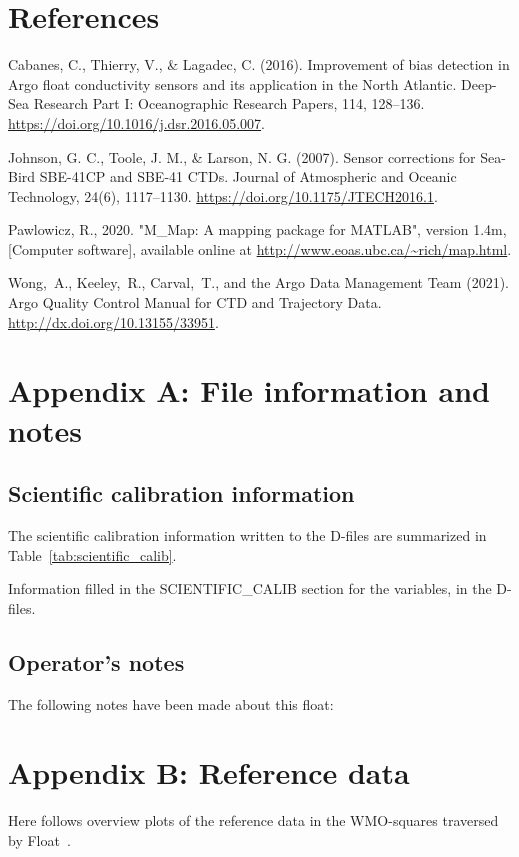 \documentclass{article}
\begin{document}
\section*{References}
\begin{list}{}{}
\item Cabanes, C., Thierry, V., \& Lagadec, C. (2016). Improvement of bias
  detection in Argo float conductivity sensors and its application in the
  North Atlantic. Deep-Sea Research Part I: Oceanographic Research Papers,
  114, 128–136. \href{url}{https://doi.org/10.1016/j.dsr.2016.05.007}.
\item Johnson, G. C., Toole, J. M., \& Larson, N. G. (2007). Sensor
  corrections for Sea-Bird SBE-41CP and SBE-41 CTDs. Journal of
  Atmospheric and Oceanic Technology, 24(6), 1117–1130.
  \href{url}{https://doi.org/10.1175/JTECH2016.1}.
\item Pawlowicz, R., 2020. "M\_Map: A mapping package for MATLAB", version
  1.4m, [Computer software], available online at
  \url{http://www.eoas.ubc.ca/~rich/map.html}.
\item Wong,~A., Keeley,~R., Carval,~T., and the Argo Data Management Team
  (2021).  Argo Quality Control Manual for CTD and Trajectory Data.
  \href{url}{http://dx.doi.org/10.13155/33951}.
\end{list}



\newpage
\section{Appendix A: File information and notes}\label{sec:appendix-notes}
%
\subsection*{Scientific calibration information}
The scientific calibration information written to the D-files are
summarized in Table~\ref{tab:scientific_calib}.
%
\begin{table}[!h]
  \caption{Information filled in the SCIENTIFIC\_CALIB section for the variables, in the D-files.} \label{tab:scientific_calib} 
  
\end{table}

\subsection*{Operator's notes}
The following notes have been made about this float:



\section{Appendix B: Reference data}\label{sec:appendix-refdata}
Here follows overview plots of the reference data in the WMO-squares
traversed by Float~\WMOnum.


\end{document}
